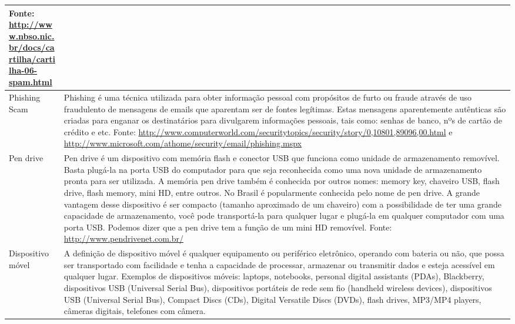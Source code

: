 \begin{longtable}{|>{\centering\arraybackslash}m{3cm}|>{\raggedright\arraybackslash}m{12cm}|}
Fonte: \url{http://www.nbso.nic.br/docs/cartilha/cartilha-06-spam.html} \\
\hline
Phishing Scam & Phishing é uma técnica utilizada para obter informação pessoal com propósitos de furto ou fraude através de uso fraudulento de mensagens de emails que aparentam ser de fontes legítimas. Estas mensagens aparentemente autênticas são criadas para enganar os destinatários para divulgarem informações pessoais, tais como: senhas de banco, nºs de cartão de crédito e etc.  
Fonte: \url{http://www.computerworld.com/securitytopics/security/story/0,10801,89096,00.html} e  
\url{http://www.microsoft.com/athome/security/email/phishing.mspx} \\
\hline
Pen drive & Pen drive é um dispositivo com memória flash e conector USB que funciona como unidade de armazenamento removível. Basta plugá-la na porta USB do computador para que seja reconhecida como uma nova unidade de armazenamento pronta para ser utilizada.  
A memória pen drive também é conhecida por outros nomes: memory key, chaveiro USB, flash drive, flash memory, mini HD, entre outros. No Brasil é popularmente conhecida pelo nome de pen drive.  
A grande vantagem desse dispositivo é ser compacto (tamanho aproximado de um chaveiro) com a possibilidade de ter uma grande capacidade de armazenamento, você pode transportá-la para qualquer lugar e plugá-la em qualquer computador com uma porta USB. Podemos dizer que a pen drive tem a função de um mini HD removível.  
Fonte: \url{http://www.pendrivenet.com.br/} \\
\hline
Dispositivo móvel & A definição de dispositivo móvel é qualquer equipamento ou periférico eletrônico, operando com bateria ou não, que possa ser transportado com facilidade e tenha a capacidade de processar, armazenar ou transmitir dados e esteja acessível em qualquer lugar.  
Exemplos de dispositivos móveis: laptops, notebooks, personal digital assistants (PDAs), Blackberry, dispositivos USB (Universal Serial Bus), dispositivos portáteis de rede sem fio (handheld wireless devices), dispositivos USB (Universal Serial Bus), Compact Discs (CDs), Digital Versatile Discs (DVDs), flash drives, MP3/MP4 players, câmeras digitais, telefones com câmera. \\



\end{longtable}